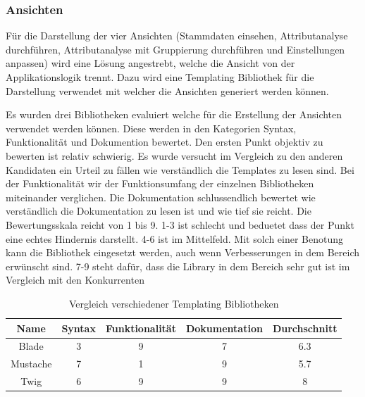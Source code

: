 \subsubsection{Ansichten}
\label{sec:proofofconcept:architektur:anforderungen:ansichten}
Für die Darstellung der vier Ansichten (Stammdaten einsehen, Attributanalyse durchführen, Attributanalyse mit Gruppierung durchführen und Einstellungen anpassen) wird eine Lösung angestrebt, welche die Ansicht von der Applikationslogik trennt. Dazu wird eine Templating Bibliothek für die Darstellung verwendet mit welcher die Ansichten generiert werden können. 

Es wurden drei Bibliotheken evaluiert welche für die Erstellung der Ansichten verwendet werden können. Diese werden in den Kategorien Syntax, Funktionalität und Dokumention bewertet. Den ersten Punkt objektiv zu bewerten ist relativ schwierig. Es wurde versucht im Vergleich zu den anderen Kandidaten ein Urteil zu fällen wie verständlich die Templates zu lesen sind. Bei der Funktionalität wir der Funktionsumfang der einzelnen Bibliotheken miteinander verglichen. Die Dokumentation schlussendlich bewertet wie verständlich die Dokumentation zu lesen ist und wie tief sie reicht. Die Bewertungsskala reicht von 1 bis 9. 1-3 ist schlecht und beduetet dass der Punkt eine echtes Hindernis darstellt. 4-6 ist im Mittelfeld. Mit solch einer Benotung kann die Bibliothek eingesetzt werden, auch wenn Verbesserungen in dem Bereich erwünscht sind. 7-9 steht dafür, dass die Library in dem Bereich sehr gut ist im Vergleich mit den Konkurrenten
\begin{table}[H] 
	\caption{Vergleich verschiedener Templating Bibliotheken}
	\centering
	\label{fig:proofofconcept:architektur:anforderungen:ansichten:1}
	\begin{tabular}{ | c | c | c | c | c | } 
		\hline 		
		\rowcolor{tableheadcolor}
		\bfseries Name & \bfseries Syntax & \bfseries Funktionalität & \bfseries Dokumentation & \bfseries Durchschnitt \\ \hline 
		
		Blade & \cellcolor{red!25}3 & \cellcolor{green!25}9 & \cellcolor{green!25}7 & \cellcolor{yellow!25}6.3\\ \hline 
		Mustache & \cellcolor{yellow!25}7 & \cellcolor{red!25}1 & \cellcolor{green!25}9 & \cellcolor{yellow!25}5.7\\ \hline 
		Twig & \cellcolor{green!25}6 & \cellcolor{green!25}9 & \cellcolor{green!25}9 & \cellcolor{green!25}8 \\ \hline 
	\end{tabular}
\end{table}


